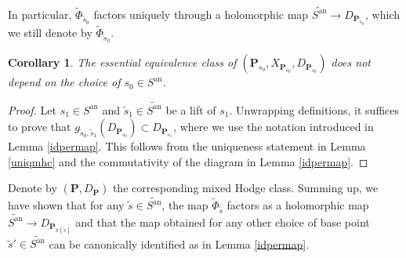 \documentclass[10pt]{article}
\numberwithin{equation}{subsection}
\theoremstyle{plain}
\newtheorem{proposition}[theorem]{Proposition}
\newtheorem{corollary}[theorem]{Corollary}
\theoremstyle{definition}
\theoremstyle{remark}
\newcommand{\Q}{\mathbb Q}
\newcommand{\V}{\mathbb V}
\newcommand{\W}{\mathbb W}
\newcommand{\pp}{\mathbf P}
\newcommand{\bul}{\bullet}
\newcommand{\an}{\mathrm{an}}
\newcommand{\quo}{\backslash}
\begin{document}
In particular, $\tilde{\Phi}_{\tilde{s}_0}$ factors uniquely through a holomorphic map $\widetilde{S^\an} \rightarrow D_{\pp_{s_0}}$, which we still denote by $\tilde{\Phi}_{\tilde{s}_0}$.
 \begin{corollary}
 The essential equivalence class of $(\pp_{s_0}, X_{\pp_{s_0}}, D_{\pp_{s_0}})$ does not depend on the choice of $s_0 \in S^\an$. 
 \end{corollary}
 \begin{proof}
Let $s_1 \in S^\an$ and $\tilde{s}_1 \in \widetilde{S^\an}$ be a lift of $s_1$. Unwrapping definitions, it suffices to prove that $g_{\tilde{s}_0, \tilde{s}_1}(D_{\pp_{s_0}}) \subset D_{\pp_{s_1}}$, where we use the notation introduced in Lemma \ref{idpermap}. This follows from the uniqueness statement in Lemma \ref{uniqmhc} and the commutativity of the diagram in Lemma \ref{idpermap}.
 \end{proof}
 Denote by $(\pp, D_\pp)$ the corresponding mixed Hodge class. Summing up, we have shown that for any $\tilde{s} \in \widetilde{S^\an}$, the map $\tilde{\Phi}_{\tilde{s}}$ factors as a holomorphic map $\widetilde{S^\an} \rightarrow D_{\pp_{\pi(\tilde{s})}}$ and that the map obtained for any other choice of base point $\tilde{s}' \in \widetilde{S^\an}$ can be canonically identified as in Lemma \ref{idpermap}. 
\end{document}

